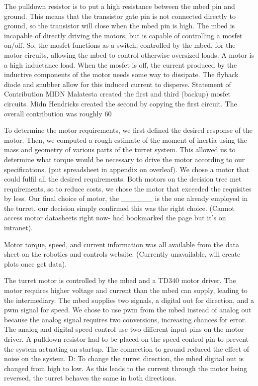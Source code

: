 The pulldown resistor is to put a high resistance between the mbed pin and ground. This means that the transistor gate pin is not connected directly to ground, so the transistor will close when the mbed pin is high.
The mbed is incapable of directly driving the motors, but is capable of controlling a mosfet on/off. So, the mosfet functions as a switch, controlled by the mbed, for the motor circuits, allowing the mbed to control otherwise oversized loads.
A motor is a high inductance load. When the mosfet is off, the current produced by the inductive components of the motor needs some way to dissipate. The flyback diode and snubber allow for this induced current to disperse. 
Statement of Contribution
MIDN Malatesta created the first and third (backup) mosfet circuits. Midn Hendricks created the second by copying the first circuit. The overall contribution was roughly 60%





To determine the motor requirements, we first defined the desired response of the motor. Then, we computed a rough estimate of the moment of inertia using the mass and geometry of various parts of the turret system. This allowed us to determine what torque would be necessary to drive the motor according to our specifications. (put spreadsheet in appendix on overleaf).
	We chose a motor that could fulfil all the desired requirements. Both motors on the decision tree met requirements, so to reduce costs, we chose the motor that exceeded the requisites by less. Our final choice of motor, the ______ is the one already employed in the turret, our decision simply confirmed this was the right choice. (Cannot access motor datasheets right now- had bookmarked the page but it’s on intranet).

Motor torque, speed, and current information was all available from the data sheet on the robotics and controls website. (Currently unavailable, will create plots once get data).

The turret motor is controlled by the mbed and a TD340 motor driver. The motor requires higher voltage and current than the mbed can supply, leading to the intermediary. The mbed supplies two signals, a digital out for direction, and a pwm signal for speed. We chose to use pwm from the mbed instead of analog out because the analog signal requires two conversions, increasing chances for error. The analog and digital speed control use two different input pins on the motor driver. A pulldown resistor had to be placed on the speed control pin to prevent the system actuating on startup. The connection to ground reduced the effect of noise on the system.
D: To change the turret direction, the mbed digital out is changed from high to low. As this leads to the current through the motor being reversed, the turret behaves the same in both directions.


